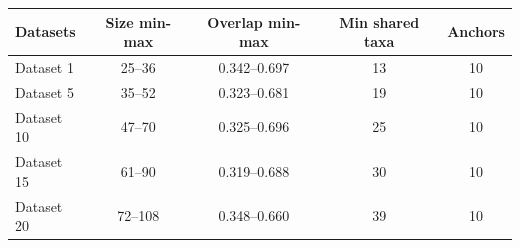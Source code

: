 \begin{tabular}{lcccc}
\hline
Datasets & Size min-max & Overlap min-max & Min shared taxa & Anchors \\
\hline
Dataset 1 & 25--36 & 0.342--0.697 & 13 & 10 \\
Dataset 5 & 35--52 & 0.323--0.681 & 19 & 10 \\
Dataset 10 & 47--70 & 0.325--0.696 & 25 & 10 \\
Dataset 15 & 61--90 & 0.319--0.688 & 30 & 10 \\
Dataset 20 & 72--108 & 0.348--0.660 & 39 & 10 \\
\hline
\end{tabular}
